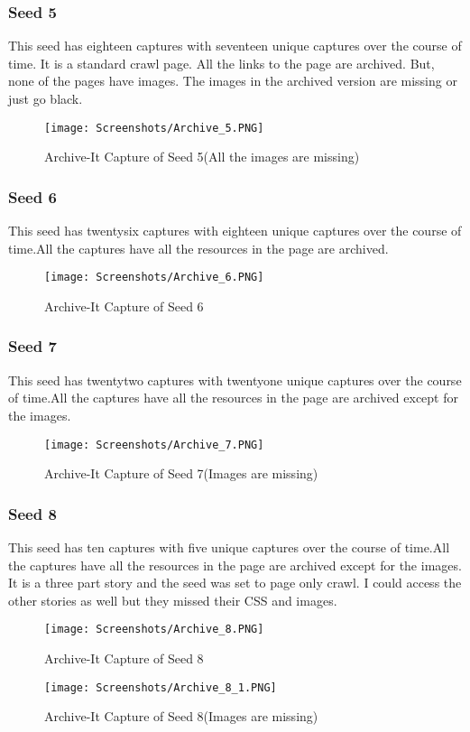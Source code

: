 \documentclass[11pt,journal,compsoc,onecolumn]{IEEEtran}
\begin{document}
\subsubsection{Seed 5}
This seed has eighteen captures with seventeen unique captures over the course of time. It is a standard crawl page. All the links to the page are archived. But, none of the pages have images. The images in the archived version are missing or just go black.
 \begin{figure}[ht] 
  \centering
  \texttt{[image: Screenshots/Archive\_5.PNG]}
  \caption{Archive-It Capture of Seed 5(All the images are missing)}
  \label{fig:27}
\end{figure}
\subsubsection{Seed 6}
This seed has twentysix captures with eighteen unique captures over the course of time.All the captures have all the resources in the page are archived.
 \begin{figure}[ht] 
  \centering
  \texttt{[image: Screenshots/Archive\_6.PNG]}
  \caption{Archive-It Capture of Seed 6}
  \label{fig:28}
\end{figure}
\subsubsection{Seed 7}
This seed has twentytwo captures with twentyone unique captures over the course of time.All the captures have all the resources in the page are archived except for the images.
 \begin{figure}[ht] 
  \centering
  \texttt{[image: Screenshots/Archive\_7.PNG]}
  \caption{Archive-It Capture of Seed 7(Images are missing)}
  \label{fig:29}
\end{figure}
\subsubsection{Seed 8}
This seed has ten captures with five unique captures over the course of time.All the captures have all the resources in the page are archived except for the images. It is a three part story and the seed was set to page only crawl. I could access the other stories as well but they missed their CSS and images.
 \begin{figure}[ht] 
  \centering
  \texttt{[image: Screenshots/Archive\_8.PNG]}
  \caption{Archive-It Capture of Seed 8}
  \label{fig:30}
\end{figure}
 \begin{figure}[ht] 
  \centering
  \texttt{[image: Screenshots/Archive\_8\_1.PNG]}
  \caption{Archive-It Capture of Seed 8(Images are missing)}
  \label{fig:31}
\end{figure}
\end{document}
